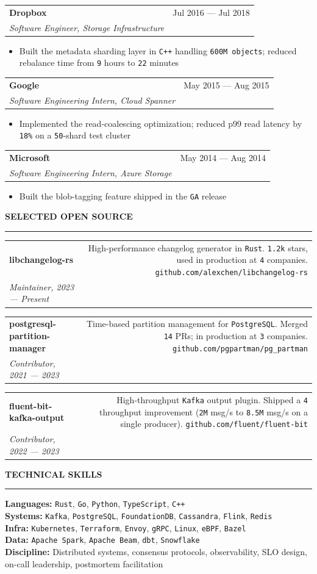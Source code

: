 \documentclass[letterpaper,10pt]{article}
\makeatletter
\newcommand{\enghead}[1]{%
  \vspace{12pt}
  {\ttfamily\bfseries\fontsize{9.5}{12}\selectfont\textcolor{engBody}{\MakeUppercase{#1}}}
  \vspace{4pt}
  \noindent\textcolor{engDiv}{\rule{\linewidth}{0.5pt}}
  \vspace{4pt}
}
\newcommand{\role}[3]{%
  \vspace{4pt}
  \begin{tabularx}{\linewidth}{@{}Xr@{}}
    \textbf{#1} & \ttfamily\textcolor{engSec}{#3} \\
    \textit{#2} & \\
  \end{tabularx}
  \vspace{2pt}
}
\newcommand{\m}[1]{\texttt{\small #1}}
\makeatother
\begin{document}
\role{Dropbox}{Software Engineer, Storage Infrastructure}{Jul 2016 --- Jul 2018}
\begin{itemize}
  \item Built the metadata sharding layer in \m{C++} handling \m{600M objects}; reduced rebalance time from \m{9} hours to \m{22} minutes
\end{itemize}

\role{Google}{Software Engineering Intern, Cloud Spanner}{May 2015 --- Aug 2015}
\begin{itemize}
  \item Implemented the read-coalescing optimization; reduced p99 read latency by \m{18\%} on a \m{50}-shard test cluster
\end{itemize}

\role{Microsoft}{Software Engineering Intern, Azure Storage}{May 2014 --- Aug 2014}
\begin{itemize}
  \item Built the blob-tagging feature shipped in the \m{GA} release
\end{itemize}

\enghead{Selected Open Source}

\role{libchangelog-rs}{Maintainer, 2023 --- Present}
{\fontsize{10}{14}\selectfont High-performance changelog generator in \m{Rust}. \m{1.2k} stars, used in production at \m{4} companies. \texttt{github.com/alexchen/libchangelog-rs}}

\vspace{4pt}
\role{postgresql-partition-manager}{Contributor, 2021 --- 2023}
{\fontsize{10}{14}\selectfont Time-based partition management for \m{PostgreSQL}. Merged \m{14} PRs; in production at \m{3} companies. \texttt{github.com/pgpartman/pg\_partman}}

\vspace{4pt}
\role{fluent-bit-kafka-output}{Contributor, 2022 --- 2023}
{\fontsize{10}{14}\selectfont High-throughput \m{Kafka} output plugin. Shipped a \m{4\texttimes{}} throughput improvement (\m{2M} msg/s to \m{8.5M} msg/s on a single producer). \texttt{github.com/fluent/fluent-bit}}

\enghead{Technical Skills}

\noindent\textbf{Languages:} \m{Rust}, \m{Go}, \m{Python}, \m{TypeScript}, \m{C++} \\
\textbf{Systems:} \m{Kafka}, \m{PostgreSQL}, \m{FoundationDB}, \m{Cassandra}, \m{Flink}, \m{Redis} \\
\textbf{Infra:} \m{Kubernetes}, \m{Terraform}, \m{Envoy}, \m{gRPC}, \m{Linux}, \m{eBPF}, \m{Bazel} \\
\textbf{Data:} \m{Apache Spark}, \m{Apache Beam}, \m{dbt}, \m{Snowflake} \\
\textbf{Discipline:} Distributed systems, consensus protocols, observability, SLO design, on-call leadership, postmortem facilitation
\end{document}
